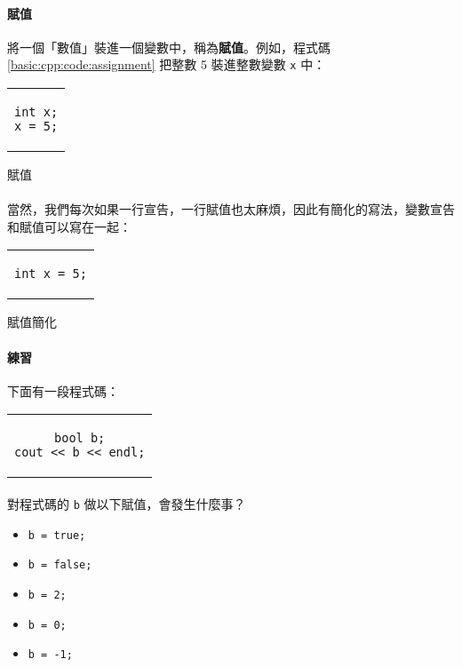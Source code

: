 \documentclass[12pt,a4paper,oneside]{article}
\begin{document}
\begin{CJK}{UTF8}{bkai}
\paragraph{賦值}將一個「數值」裝進一個變數中，稱為\textbf{賦值}。例如，程式碼 \ref{basic:cpp:code:assignment} 把整數 5 裝進整數變數 \lstinline!x! 中：

\begin{code}[h!]
\centering
\begin{tabular}{c}
\begin{lstlisting}
int x;
x = 5;
\end{lstlisting}
\end{tabular}
\caption{賦值}
\label{basic:cpp:code:assignment}
\end{code}

\paragraph{}當然，我們每次如果一行宣告，一行賦值也太麻煩，因此有簡化的寫法，變數宣告和賦值可以寫在一起：

\begin{code}[h!]
\centering
\begin{tabular}{c}
\begin{lstlisting}
int x = 5;
\end{lstlisting}
\end{tabular}
\caption{賦值簡化}
\label{basic:cpp:code:assignment:simple}
\end{code}

\paragraph{練習}下面有一段程式碼：

\begin{code}[h!]
\centering
\begin{tabular}{c}
\begin{lstlisting}
bool b;
cout << b << endl;
\end{lstlisting}
\end{tabular}
\label{basic:cpp:code:practice:bool}
\end{code}

\paragraph{}對程式碼的 \lstinline!b! 做以下賦值，會發生什麼事？
\begin{itemize}
\item \lstinline!b = true;!
\item \lstinline!b = false;!
\item \lstinline!b = 2;!
\item \lstinline!b = 0;!
\item \lstinline!b = -1;!
\end{itemize}
  

\end{CJK}
\end{document}
